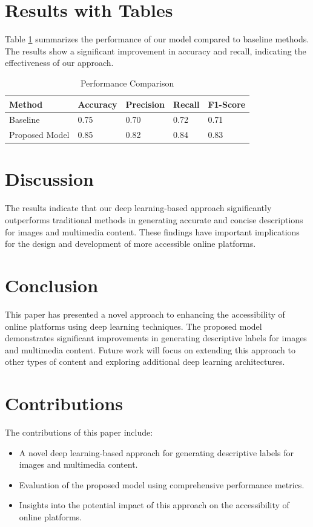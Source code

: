 \documentclass{article}
\begin{document}
\section{Results with Tables}
Table \ref{tab:results} summarizes the performance of our model compared to baseline methods. The results show a significant improvement in accuracy and recall, indicating the effectiveness of our approach.

\begin{table}[ht]
\centering
\caption{Performance Comparison}
\label{tab:results}
\begin{tabular}{@{}lllll@{}}
\toprule
Method & Accuracy & Precision & Recall & F1-Score \\ \midrule
Baseline & 0.75 & 0.70 & 0.72 & 0.71 \\
Proposed Model & 0.85 & 0.82 & 0.84 & 0.83 \\ \bottomrule
\end{tabular}
\end{table}

\section{Discussion}
The results indicate that our deep learning-based approach significantly outperforms traditional methods in generating accurate and concise descriptions for images and multimedia content. These findings have important implications for the design and development of more accessible online platforms.

\section{Conclusion}
This paper has presented a novel approach to enhancing the accessibility of online platforms using deep learning techniques. The proposed model demonstrates significant improvements in generating descriptive labels for images and multimedia content. Future work will focus on extending this approach to other types of content and exploring additional deep learning architectures.

\section{Contributions}
The contributions of this paper include:
\begin{itemize}
    \item A novel deep learning-based approach for generating descriptive labels for images and multimedia content.
    \item Evaluation of the proposed model using comprehensive performance metrics.
    \item Insights into the potential impact of this approach on the accessibility of online platforms.
\end{itemize}



\end{document}
